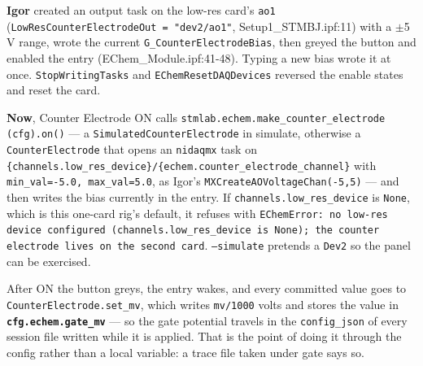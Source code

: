 \textbf{Igor} created an output task on the low-res card's \texttt{ao1} (\texttt{Low\discretionary{}{}{}Res\discretionary{}{}{}Counter\discretionary{}{}{}Electrode\discretionary{}{}{}Out = "dev2/\discretionary{}{}{}ao1"}, Setup1\_STMBJ.ipf:11) with a $\pm$5 V range, wrote the current \texttt{G\_\discretionary{}{}{}Counter\discretionary{}{}{}Electrode\discretionary{}{}{}Bias}, then greyed the button and enabled the entry (EChem\_Module.ipf:41-48). Typing a new bias wrote it at once. \texttt{Stop\discretionary{}{}{}Writing\discretionary{}{}{}Tasks} and \texttt{EChem\discretionary{}{}{}Reset\discretionary{}{}{}DAQDevices} reversed the enable states and reset the card.

\textbf{Now}, Counter Electrode ON calls \texttt{stmlab.\discretionary{}{}{}echem.\discretionary{}{}{}make\_\discretionary{}{}{}counter\_\discretionary{}{}{}electrode (cfg).\discretionary{}{}{}on()} --- a \texttt{Simulated\discretionary{}{}{}Counter\discretionary{}{}{}Electrode} in simulate, otherwise a \texttt{Counter\discretionary{}{}{}Electrode} that opens an \texttt{nidaqmx} task on \texttt{\{channels.\discretionary{}{}{}low\_\discretionary{}{}{}res\_\discretionary{}{}{}device\}/\discretionary{}{}{}\{echem.\discretionary{}{}{}counter\_\discretionary{}{}{}electrode\_\discretionary{}{}{}channel\}} with \texttt{min\_\discretionary{}{}{}val=-5.\discretionary{}{}{}0,\discretionary{}{}{} max\_\discretionary{}{}{}val=5.\discretionary{}{}{}0}, as Igor's \texttt{MXCreate\discretionary{}{}{}AOVoltage\discretionary{}{}{}Chan(-5,\discretionary{}{}{}5)} --- and then writes the bias currently in the entry. If \texttt{channels.\discretionary{}{}{}low\_\discretionary{}{}{}res\_\discretionary{}{}{}device} is \texttt{None}, which is this one-card rig's default, it refuses with \texttt{EChem\discretionary{}{}{}Error: no low-res device configured (channels.\discretionary{}{}{}low\_\discretionary{}{}{}res\_\discretionary{}{}{}device is None); the counter electrode lives on the second card}. \texttt{--simulate} pretends a \texttt{Dev2} so the panel can be exercised.

After ON the button greys, the entry wakes, and every committed value goes to \texttt{Counter\discretionary{}{}{}Electrode.\discretionary{}{}{}set\_\discretionary{}{}{}mv}, which writes \texttt{mv/\discretionary{}{}{}1000} volts and stores the value in \textbf{\texttt{cfg.\discretionary{}{}{}echem.\discretionary{}{}{}gate\_\discretionary{}{}{}mv}} --- so the gate potential travels in the \texttt{config\_\discretionary{}{}{}json} of every session file written while it is applied. That is the point of doing it through the config rather than a local variable: a trace file taken under gate says so.


